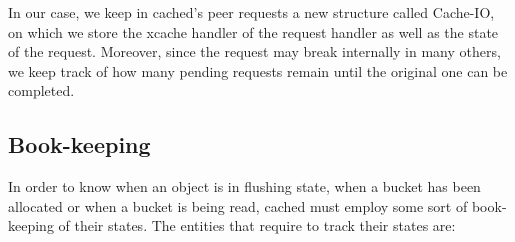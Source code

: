 In our case, we keep in cached's peer requests a new structure called Cache-IO, 
on which we store the xcache handler of the request handler as well as the 
state of the request. Moreover, since the request may break internally in many 
others, we keep track of how many pending requests remain until the original 
one can be completed.

\subsection{Book-keeping}\label{sec:cached-states-design}

In order to know when an object is in flushing state, when a bucket has been 
allocated or when a bucket is being read, cached must employ some sort of 
book-keeping of their states. The entities that require to track their states 
are:

